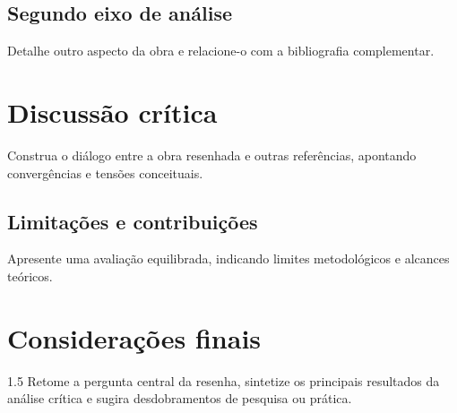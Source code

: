 \documentclass[12pt, a4paper, oneside]{abntex2}
\renewcommand{\bibname}{\textbf{\MakeUppercase{REFERÊNCIAS}}}
\begin{document}
\section{Segundo eixo de análise}
Detalhe outro aspecto da obra e relacione-o com a bibliografia complementar.

\chapter{Discussão crítica}
Construa o diálogo entre a obra resenhada e outras referências, apontando convergências e tensões conceituais.

\section{Limitações e contribuições}
Apresente uma avaliação equilibrada, indicando limites metodológicos e alcances teóricos.

\chapter{Considerações finais}
\begin{Spacing}{1.5}
Retome a pergunta central da resenha, sintetize os principais resultados da análise crítica e sugira desdobramentos de pesquisa ou prática.
\end{Spacing}
\fi

\postextual
{}

\renewcommand{\bibname}{\MakeUppercase{REFERÊNCIAS}}

\end{document}
